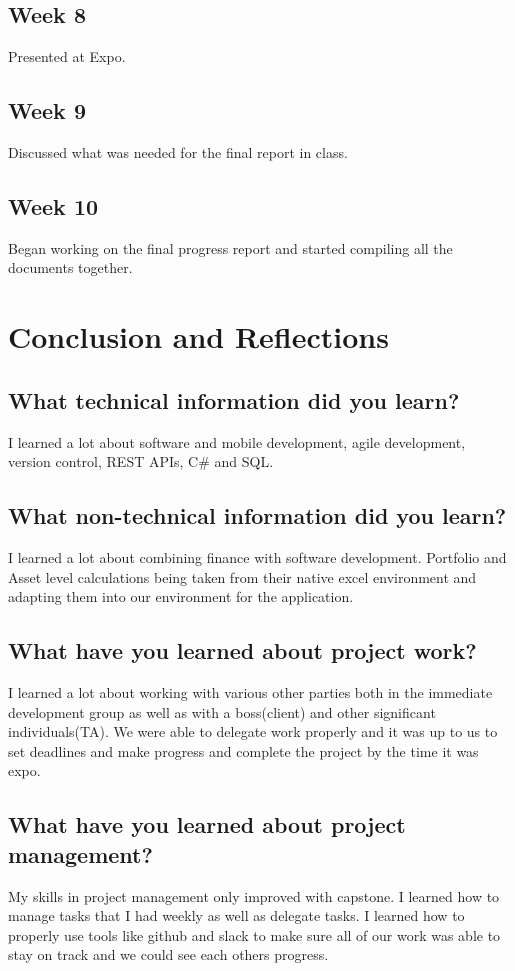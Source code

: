 \documentclass[onecolumn, draftclsnofoot,10pt, compsoc]{IEEEtran}
\begin{document}
    \subsection{Week 8} 
    Presented at Expo. 
    
    \subsection{Week 9}
    Discussed what was needed for the final report in class.
    
    \subsection{Week 10} 
    Began working on the final progress report and started compiling all the documents together. 
    
    
\section{Conclusion and Reflections} 
    \subsection{What technical information did you learn?} 
    I learned a lot about software and mobile development, agile development, version control, REST APIs, C# and SQL.

    
    \subsection{What non-technical information did you learn?} 
    I learned a lot about combining finance with software development. Portfolio and Asset level calculations being taken from their native excel environment and adapting them into our environment for the application.

    
    \subsection{What have you learned about project work?} 
    I learned a lot about working with various other parties both in the immediate development group as well as with a boss(client) and other significant individuals(TA). We were able to delegate work properly and it was up to us to set deadlines and make progress and complete the project by the time it was expo. 
    
    \subsection{What have you learned about project management?} 
    My skills in project management only improved with capstone. I learned how to manage tasks that I had weekly as well as delegate tasks. I learned how to properly use tools like github and slack  to make sure all of our work was able to stay on track and we could see each others progress.
    
\end{document}
